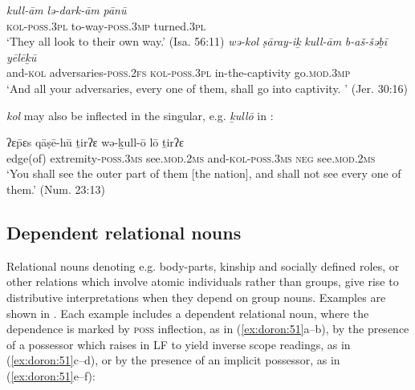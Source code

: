 \documentclass[output=paper]{langsci/langscibook}
\begin{document}
\ea%
    \label{ex:doron:49}
    \ea
    \gll \textit{kull-ām}             \textit{lə-dark-ām}            \textit{pānū}\\
         \textsc{kol-poss.3pl}  to-way-\textsc{poss.3mp}  turned.\textsc{3pl}\\
    \glt `They all look to their own way.' (Isa. 56:11)
    \ex
    \gll \textit{wə-kol}     \textit{ṣāray-iḵ}                        \textit{kull-ām}            \textit{b-aš-šəḇī}            \textit{yēlēḵū}\\
         and-\textsc{kol} adversaries-\textsc{poss.2fs}   \textsc{kol-poss.3pl}  in-the-captivity  go.\textsc{mod.3mp} \\
    \glt `And all your adversaries, every one of them, shall go into captivity. ' (Jer. 30:16)
    \z
\z

\textit{kol} may also be inflected in the singular, e.g. \textit{ḵullō} in :

\ea%
    \label{ex:doron:50}
    \gll ʔɛ\={p}ɛs      qāṣē-hū   ṯirʔɛ    wə-ḵull-ō   lō    ṯirʔɛ\\
         edge(of) extremity-\textsc{poss.3ms}  see.\textsc{mod.}2\textsc{ms}   and-\textsc{kol}{}-\textsc{poss.}3\textsc{ms}  \textsc{neg}  see.\textsc{mod.}2\textsc{ms}\\
    \glt `You shall see the outer part of them [the nation], and shall not see every one of them.' (Num. 23:13)
    \z

\subsection{Dependent relational nouns}%

Relational nouns denoting e.g. body-parts, kinship and socially defined roles, or other relations which involve atomic individuals rather than groups, give rise to distributive interpretations when they depend on group nouns. Examples are shown in . Each example includes a dependent relational noun, where the dependence is marked by \textsc{poss} inflection, as in (\ref{ex:doron:51}a--b), by the presence of a possessor which raises in LF to yield inverse scope readings, as in (\ref{ex:doron:51}c--d), or by the presence of an implicit possessor, as in (\ref{ex:doron:51}e--f):
\end{document}
